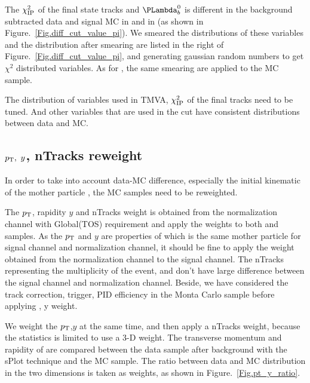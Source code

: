 The $\chi^2_{\rm IP}$ of the final state tracks and $\Lb$ is different in the background subtracted data and signal MC  
in \LbLcDs and in \LbLckkpi(as shown in Figure.~\ref{Fig.diff_cut_value_pi}). 
We smeared the distributions of these variables and the distribution after smearing are listed in the right of Figure.~\ref{Fig.diff_cut_value_pi}, 
and generating gaussian random numbers to get $\chi^2$ distributed variables. 
As for \LbLckkpi, the same smearing are applied to the MC sample.


The distribution of variables used in TMVA, 
$\chi^2_{\rm IP}$ of the final tracks need to be tuned. 
And other variables that are used in the cut have consistent distributions between data and MC.

\subsection{$p_{\mathrm{T}}, ~y$, nTracks reweight}
\label{sec:getptyweight}

In order to take into account data-MC difference, 
especially the initial kinematic of the mother particle \Lb, the MC samples need to be reweighted. 

The $p_{\mathrm{T}}$, rapidity $y$ and nTracks weight is obtained from the normalization channel \LbLcDs  with \Lb Global(TOS) requirement 
and apply the weights to both \LbLckkpi and \LbLcDs samples. 
As the $p_{\mathrm{T}}$ and $y$ are properties of \Lb which is the same mother particle for signal channel and normalization channel, 
it should be fine to apply the weight obtained from the normalization channel to the signal channel. 
The nTracks representing the multiplicity of the event, 
and don't have large difference between the signal channel and normalization channel. 
Beside, 
we have considered the track correction, trigger, PID efficiency in the Monta Carlo sample before applying \pt, y weight. 

We weight the $p_{\mathrm{T}}$,$y$ at the same time, 
and then apply a nTracks weight, because the statistics is limited to use a 3-D weight. 
The transverse momentum and rapidity of \Lb are compared between the data sample after background with the sPlot technique and the MC sample. 
The ratio between data and MC distribution in the two dimensions is taken as weights, 
as shown in Figure.~\ref{Fig.pt_y_ratio}. 

